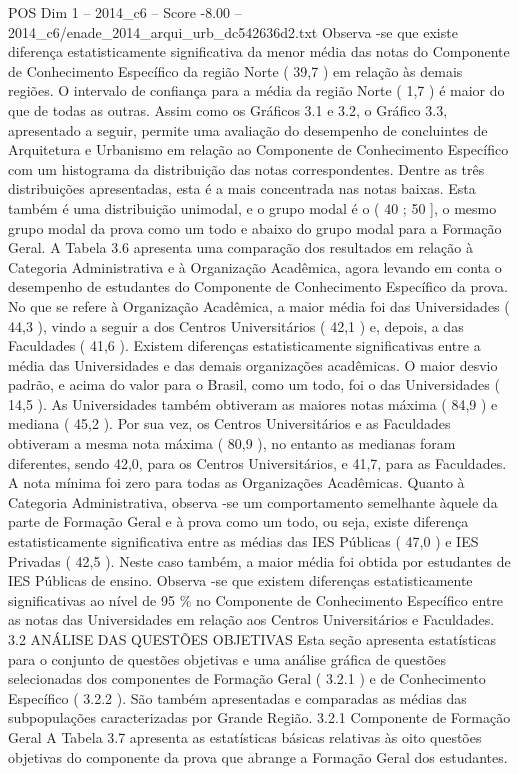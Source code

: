 \begin{textsample}{POS Dim 1 – 2014\_c6 – Score -8.00 – 2014\_c6/enade\_2014\_arqui\_urb\_dc542636d2.txt}
Observa -se que existe diferença estatisticamente significativa da menor média das notas do Componente de Conhecimento Específico da região Norte ( 39,7 ) em relação às demais regiões.
O intervalo de confiança para a média da região Norte ( 1,7 ) é maior do que de todas as outras.
Assim como os Gráficos 3.1 e 3.2, o Gráfico 3.3, apresentado a seguir, permite uma avaliação do desempenho de concluintes de Arquitetura e Urbanismo em relação ao Componente de Conhecimento Específico com um histograma da distribuição das notas correspondentes.
Dentre as três distribuições apresentadas, esta é a mais concentrada nas notas baixas.
Esta também é uma distribuição unimodal, e o grupo modal é o ( 40 ; 50 ], o mesmo grupo modal da prova como um todo e abaixo do grupo modal para a Formação Geral.
A Tabela 3.6 apresenta uma comparação dos resultados em relação à Categoria Administrativa e à Organização Acadêmica, agora levando em conta o desempenho de estudantes do Componente de Conhecimento Específico da prova.
No que se refere à Organização Acadêmica, a maior média foi das Universidades ( 44,3 ), vindo a seguir a dos Centros Universitários ( 42,1 ) e, depois, a das Faculdades ( 41,6 ).
Existem diferenças estatisticamente significativas entre a média das Universidades e das demais organizações acadêmicas.
O maior desvio padrão, e acima do valor para o Brasil, como um todo, foi o das Universidades ( 14,5 ).
As Universidades também obtiveram as maiores notas máxima ( 84,9 ) e mediana ( 45,2 ).
Por sua vez, os Centros Universitários e as Faculdades obtiveram a mesma nota máxima ( 80,9 ), no entanto as medianas foram diferentes, sendo 42,0, para os Centros Universitários, e 41,7, para as Faculdades.
A nota mínima foi zero para todas as Organizações Acadêmicas.
Quanto à Categoria Administrativa, observa -se um comportamento semelhante àquele da parte de Formação Geral e à prova como um todo, ou seja, existe diferença estatisticamente significativa entre as médias das IES Públicas ( 47,0 ) e IES Privadas ( 42,5 ).
Neste caso também, a maior média foi obtida por estudantes de IES Públicas de ensino.
Observa -se que existem diferenças estatisticamente significativas ao nível de 95 \% no Componente de Conhecimento Específico entre as notas das Universidades em relação aos Centros Universitários e Faculdades. 3.2 ANÁLISE DAS QUESTÕES OBJETIVAS Esta seção apresenta estatísticas para o conjunto de questões objetivas e uma análise gráfica de questões selecionadas dos componentes de Formação Geral ( 3.2.1 ) e de Conhecimento Específico ( 3.2.2 ).
São também apresentadas e comparadas as médias das subpopulações caracterizadas por Grande Região. 3.2.1 Componente de Formação Geral A Tabela 3.7 apresenta as estatísticas básicas relativas às oito questões objetivas do componente da prova que abrange a Formação Geral dos estudantes.

\end{textsample}
